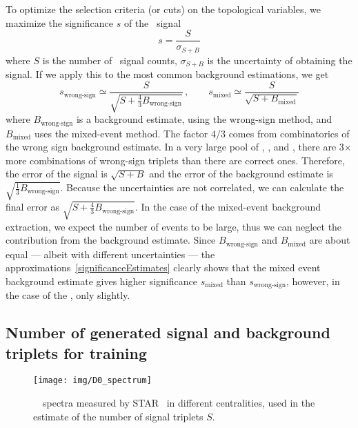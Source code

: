 To optimize the selection criteria (or cuts) on the topological variables, we maximize the significance $s$ of the \Lambdac\ signal
\begin{equation} \label{significance}
 s = \frac{S}{\sigma_{S+B}}
\end{equation}
where $S$ is the number of \Lambdac\ signal counts, $\sigma_{S+B}$ is the uncertainty of obtaining the signal.
If we apply this to the most common background estimations, we get
\begin{equation} \label{significanceEstimates}
  s_\text{wrong-sign} \simeq \frac{S}{\sqrt{S+\frac{4}{3}B_\text{wrong-sign}}}\,, \qquad
 s_\text{mixed} \simeq \frac{S}{\sqrt{S + B_\text{mixed}}} 
\end{equation}
where $B_\text{wrong-sign}$ is a background estimate, using the wrong-sign method, and $B_\text{mixed}$ uses the mixed-event method. The factor 4/3 comes from combinatorics of the wrong sign background estimate. In a very large pool of \pipm, \Kmp, and \ppm, there are 3$\times$ more combinations of wrong-sign triplets than there are correct ones. Therefore, the error of the signal is $\sqrt{S + B}$ and the error of the background estimate is $\sqrt{\frac{1}{3}B_\text{wrong-sign}}$\@. Because the uncertainties are not correlated, we can calculate the final error as $\sqrt{S+\frac{4}{3}B_\text{wrong-sign}}$\@. In the case of the mixed-event background extraction, we expect the number of events to be large, thus we can neglect the contribution from the background estimate. Since $B_\text{wrong-sign}$ and $B_\text{mixed}$ are about equal --- albeit with different uncertainties --- the approximations~\eqref{significanceEstimates} clearly shows that the mixed event background estimate gives higher significance $s_\text{mixed}$ than $s_\text{wrong-sign}$, however, in the case of the \Lambdac, only slightly.

\subsection{Number of generated signal and background triplets for training}

\begin{figure}[!htb]
\centering
\texttt{[image: img/D0\_spectrum]}

\caption[\dzero\ \pt\ spectra measured by STAR.]{\label{fig:D0spectrum}\dzero\ \pt\ spectra measured by STAR~\cite{D0paper} in different centralities, used in the estimate of the number of signal triplets $S$\@.}

\end{figure}

